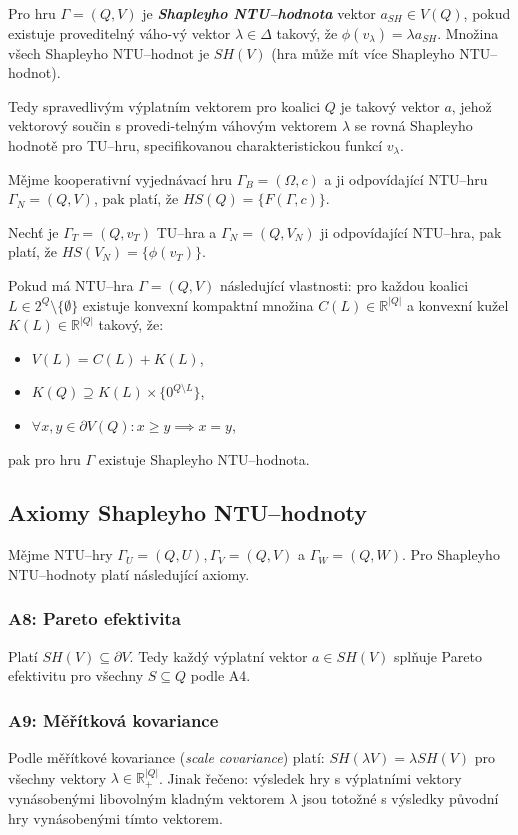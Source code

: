         Pro hru $\Gamma = (Q, V)$ je \textit{\textbf{Shapleyho NTU--hodnota}} vektor $a_{SH} \in V(Q)$, pokud existuje proveditelný váho-vý vektor $\lambda \in \Delta$ takový, že $\phi(v_\lambda) = \lambda a_{SH}$. Množina všech Shapleyho NTU--hodnot je $SH(V)$ (hra může mít více Shapleyho NTU--hodnot).

        Tedy spravedlivým výplatním vektorem pro koalici $Q$ je takový vektor $a$, jehož vektorový součin s provedi-telným váhovým vektorem $\lambda$ se rovná Shapleyho hodnotě pro TU--hru, specifikovanou charakteristickou funkcí $v_\lambda$.

        Mějme kooperativní vyjednávací hru $\Gamma_B = (\Omega, c)$ a ji odpovídající NTU--hru $\Gamma_N = (Q, V)$, pak platí, že $HS(Q) = \{F(\Gamma, c)\}$.

        Nechť je $\Gamma_T = (Q, v_T)$ TU--hra a $\Gamma_N = (Q, V_N)$ ji odpovídající NTU--hra, pak platí, že $HS(V_N) = \{\phi(v_T)\}$.

        Pokud má NTU--hra $\Gamma = (Q, V)$ následující vlastnosti: pro každou koalici $L \in 2^Q \setminus \{\emptyset\}$ existuje konvexní kompaktní množina $C(L) \in \mathbb{R}^{|Q|}$ a konvexní kužel $K(L) \in \mathbb{R}^{|Q|}$ takový, že:
        \begin{itemize}
            \item $V(L) = C(L) + K(L)$,
            \item $K(Q) \supseteq K(L) \times \{0^{Q\setminus L}\}$,
            \item $\forall x, y \in \partial V(Q): x \geqslant y \implies x = y$,
        \end{itemize}
        pak pro hru $\Gamma$ existuje Shapleyho NTU--hodnota.

    \subsection{Axiomy Shapleyho NTU--hodnoty}
        Mějme NTU--hry $\Gamma_U = (Q, U), \Gamma_V = (Q, V)$ a $\Gamma_W = (Q, W)$. Pro Shapleyho NTU--hodnoty platí následující axiomy.

        \subsubsection*{A8: Pareto efektivita}
            Platí $SH(V) \subseteq \partial V$. Tedy každý výplatní vektor $a \in SH(V)$ splňuje Pareto efektivitu pro všechny $S \subseteq Q$ podle A4.

        \subsubsection*{A9: Měřítková kovariance}
            Podle měřítkové kovariance (\textit{scale covariance}) platí: $SH(\lambda V) = \lambda SH(V)$ pro všechny vektory $\lambda \in \mathbb{R}^{|Q|}_{+}$. Jinak řečeno: výsledek hry s výplatními vektory vynásobenými libovolným kladným vektorem $\lambda$ jsou totožné s výsledky původní hry vynásobenými tímto vektorem.

